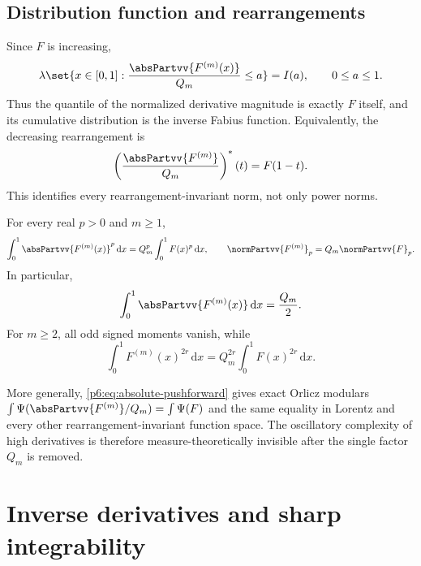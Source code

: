 \documentclass[11pt,oneside]{article}
\theoremstyle{definition}
\theoremstyle{remark}
\newcommand{\dd}{\,\mathrm d}
\newcommand{\1}{\mathbf 1}
\begin{document}
\subsection{Distribution function and rearrangements}

Since \(F\) is increasing,
\begin{equation}
 \lambda\set{x\in[0,1]:\frac{\absPartvv{F^{(m)}(x)}}{Q_m}\le a}
 =I(a),\qquad 0\le a\le1.                                \label{p6:eq:derivative-cdf}
\end{equation}
Thus the quantile of the normalized derivative magnitude is exactly \(F\) itself, and
its cumulative distribution is the inverse Fabius function.  Equivalently, the decreasing
rearrangement is
\begin{equation}
 \left(\frac{\absPartvv{F^{(m)}}}{Q_m}\right)^*(t)=F(1-t).     \label{p6:eq:decreasing-rearrangement}
\end{equation}
This identifies every rearrangement-invariant norm, not only power norms.

\begin{corollary}
\label{p6:cor:Lp-derivatives}
For every real \(p>0\) and \(m\ge1\),
\begin{equation}
 \int_0^1\absPartvv{F^{(m)}(x)}^p\dd x
 =Q_m^p\int_0^1F(x)^p\dd x,\qquad
 \normPartvv{F^{(m)}}_p=Q_m\normPartvv{F}_p.                           \label{p6:eq:Lp-derivatives}
\end{equation}
In particular,
\begin{equation}
 \int_0^1\absPartvv{F^{(m)}(x)}\dd x=\frac{Q_m}{2}.            \label{p6:eq:total-variation-derivatives}
\end{equation}
For \(m\ge2\), all odd signed moments vanish, while
\begin{equation}
 \int_0^1F^{(m)}(x)^{2r}\dd x
 =Q_m^{2r}\int_0^1F(x)^{2r}\dd x.                        \label{p6:eq:even-derivative-moments}
\end{equation}
\end{corollary}

More generally, \eqref{p6:eq:absolute-pushforward} gives exact Orlicz modulars
\(
 \int\Psi(\absPartvv{F^{(m)}}/Q_m)=\int\Psi(F)
\)
and the same equality in Lorentz and every other rearrangement-invariant function space.
The oscillatory complexity of high derivatives is therefore measure-theoretically
invisible after the single factor \(Q_m\) is removed.

\section{Inverse derivatives and sharp integrability}
\end{document}
